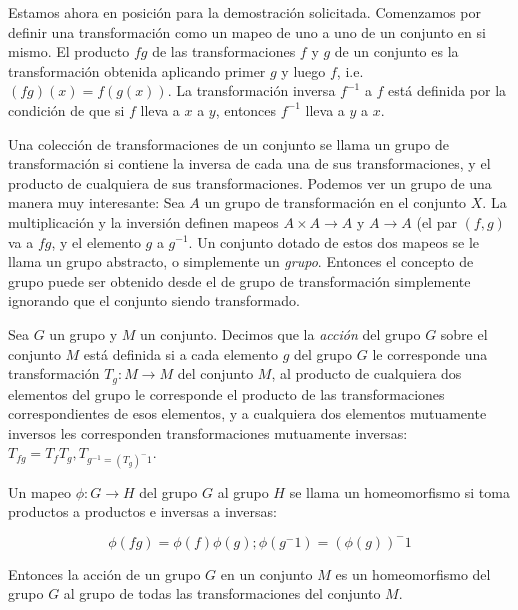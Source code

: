 \documentclass[a4paper,10pt]{article}
\numberwithin{equation}{section}
\begin{document}
Estamos ahora en posición para la demostración solicitada. Comenzamos por
definir una transformación como un mapeo de uno a uno de un conjunto en si mismo. El 
producto $fg$ de las transformaciones $f$ y $g$ de un conjunto es la 
transformación obtenida aplicando primer $g$ y luego $f$, i.e. $(fg)(x) = f(g(x))$. La 
transformación inversa $f^{-1}$ a $f$ está definida por la condición de que si
$f$ lleva a $x$ a $y$, entonces $f^{-1}$ lleva a $y$ a $x$.

\vspace{.3cm}

Una colección de transformaciones de un conjunto se llama un grupo de 
transformación si contiene la inversa de cada una de sus transformaciones,
y el producto de cualquiera de sus transformaciones. Podemos ver un grupo
de una manera muy interesante: Sea $A$ un grupo de transformación en el 
conjunto $X$. La multiplicación y la inversión definen mapeos 
$A \times A \rightarrow A$ y $A \rightarrow A$ (el par $(f,g)$ va a $fg$, y 
el elemento $g$ a $g^{-1}$. Un conjunto dotado de estos dos mapeos se le 
llama un grupo abstracto, o simplemente un \emph{grupo}. Entonces el concepto
de grupo puede ser obtenido desde el de grupo de transformación simplemente
ignorando que el conjunto siendo transformado.

\vspace{.3cm}

Sea $G$ un grupo y $M$ un conjunto. Decimos que la \emph{acción} del
grupo $G$ sobre el conjunto $M$ está definida si a cada elemento $g$ del
grupo $G$ le corresponde una transformación $T_g:M \rightarrow M$ del 
conjunto $M$, al producto de cualquiera dos elementos del grupo le corresponde
el producto de las transformaciones correspondientes de esos elementos, y 
a cualquiera dos elementos mutuamente inversos les corresponden transformaciones
mutuamente inversas: $T_{fg} = T_f T_g, T_{g^{-1} = (T_g)^-1}$. 

\vspace{.3cm}

Un mapeo $\phi: G \rightarrow H$ del grupo $G$ al grupo $H$ se llama un
homeomorfismo si toma productos a productos e inversas a inversas:

\begin{equation}
 \phi(fg) = \phi(f)\phi(g); \phi(g^-1) = (\phi(g))^-1
\end{equation}

Entonces la acción de un grupo $G$ en un conjunto $M$ es un homeomorfismo
del grupo $G$ al grupo de todas las transformaciones del conjunto $M$. 
\end{document}
